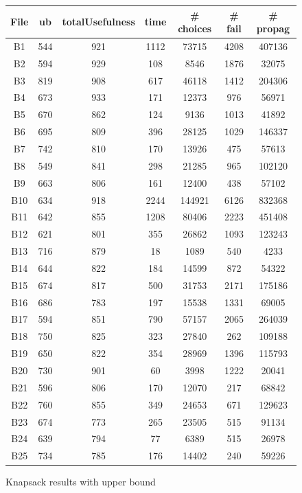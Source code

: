 \documentclass[a4paper ,12pt,french]{article}
\begin{document}
\begin{figure}[!ht]
\begin{tabular}{|c|c|c|c|c|c|c|} \hline
File & ub & totalUsefulness & time & \# choices & \# fail & \# propag\\ \hline
B1&544&921&1112&73715&4208&407136         \\ \hline
B2&594&929&108&8546&1876&32075            \\ \hline
B3&819&908&617&46118&1412&204306          \\ \hline
B4&673&933&171&12373&976&56971            \\ \hline
B5&670&862&124&9136&1013&41892            \\ \hline
B6&695&809&396&28125&1029&146337          \\ \hline
B7&742&810&170&13926&475&57613            \\ \hline
B8&549&841&298&21285&965&102120           \\ \hline
B9&663&806&161&12400&438&57102            \\ \hline
B10&634&918&2244&144921&6126&832368       \\ \hline
B11&642&855&1208&80406&2223&451408        \\ \hline
B12&621&801&355&26862&1093&123243         \\ \hline
B13&716&879&18&1089&540&4233              \\ \hline
B14&644&822&184&14599&872&54322           \\ \hline
B15&674&817&500&31753&2171&175186         \\ \hline
B16&686&783&197&15538&1331&69005          \\ \hline
B17&594&851&790&57157&2065&264039         \\ \hline
B18&750&825&323&27840&262&109188          \\ \hline
B19&650&822&354&28969&1396&115793         \\ \hline
B20&730&901&60&3998&1222&20041            \\ \hline
B21&596&806&170&12070&217&68842           \\ \hline
B22&760&855&349&24653&671&129623          \\ \hline
B23&674&773&265&23505&515&91134           \\ \hline
B24&639&794&77&6389&515&26978             \\ \hline
B25&734&785&176&14402&240&59226           \\ \hline
\end{tabular}
\caption{Knapsack results with upper bound}
\label{FIGB}
\end{figure}
\end{document}
